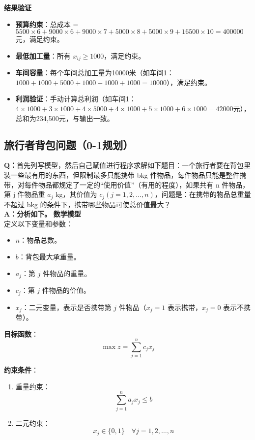 \textbf{结果验证}
\begin{itemize}
    \item \textbf{预算约束}：总成本 = \( 5500 \times 6 + 9000 \times 6 + 9000 \times 7 + 5000 \times 8 + 5000 \times 9 + 16500 \times 10 = 400000 \)元，满足约束。
    \item \textbf{最低加工量}：所有 \( x_{ij} \geq 1000 \)，满足约束。
    \item \textbf{车间容量}：每个车间总加工量为10000米（如车间1：\( 1000 + 1000 + 5000 + 1000 + 1000 + 1000 = 10000 \)），满足约束。
    \item \textbf{利润验证}：手动计算总利润（如车间1：\( 4 \times 1000 + 3 \times 1000 + 4 \times 5000 + 4 \times 1000 + 5 \times 1000 + 6 \times 1000 = 42000 \)元），总和为234,500元，与输出一致。
\end{itemize}

\subsection{旅行者背包问题（0-1规划）}
\textbf{Q：}首先列写模型，然后自己赋值进行程序求解如下题目：一个旅行者要在背包里装一些最有用的东西，但限制最多只能携带 bkg 件物品，每件物品只能是整件携带，对每件物品都规定了一定的“使用价值”（有用的程度），如果共有 n 件物品，第 j 件物品重 $a_j$ kg，其价值为 $c_j (j=1,2,…,n)$，问题是：在携带的物品总重量不超过 bkg 的条件下，携带哪些物品可使总价值最大？
\\
\textbf{A：分析如下。}
\textbf{数学模型}\\
定义以下变量和参数：
\begin{itemize}
    \item \( n \)：物品总数。
    \item \( b \)：背包最大承重量。
    \item \( a_j \)：第 \( j \) 件物品的重量。
    \item \( c_j \)：第 \( j \) 件物品的价值。
    \item \( x_j \)：二元变量，表示是否携带第 \( j \) 件物品（\( x_j = 1 \) 表示携带，\( x_j = 0 \) 表示不携带）。
\end{itemize}

\textbf{目标函数}：
\[
\max z = \sum_{j=1}^n c_j x_j
\]

\textbf{约束条件}：
\begin{enumerate}
    \item 重量约束：
    \[
    \sum_{j=1}^n a_j x_j \leq b
    \]
    \item 二元约束：
    \[
    x_j \in \{0, 1\} \quad \forall j = 1, 2, \ldots, n
    \]
\end{enumerate}

